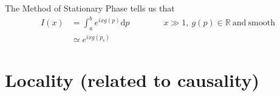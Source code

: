 \documentclass{article}
\begin{document}

\noindent The Method of Stationary Phase tells us that
\begin{align}
I(x) &= \int_a^b e^{ i x g(p) } \mathrm{d}p \qquad \qquad x \gg 1, ~ g(p) \in \mathbb{R} ~ \mathrm{and} ~ \mathrm{smooth} \nonumber\\
&\simeq e^{ i x g(p_\mathrm{s}) }
\end{align}



\section{Locality (related to causality)}
\end{document}
